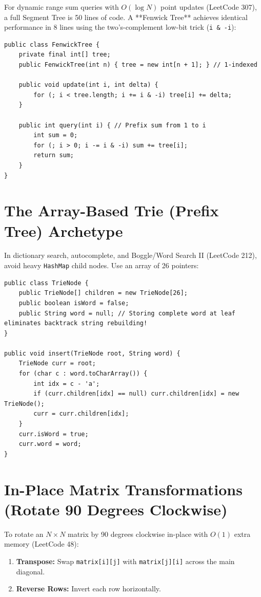 \documentclass[10pt,journal,compsoc,onecolumn]{IEEEtran}
\begin{document}
For dynamic range sum queries with $O(\log N)$ point updates (LeetCode 307), a full Segment Tree is 50 lines of code. A **Fenwick Tree** achieves identical performance in 8 lines using the two's-complement low-bit trick (\texttt{i \& -i}):

\begin{verbatim}
public class FenwickTree {
    private final int[] tree;
    public FenwickTree(int n) { tree = new int[n + 1]; } // 1-indexed

    public void update(int i, int delta) {
        for (; i < tree.length; i += i & -i) tree[i] += delta;
    }

    public int query(int i) { // Prefix sum from 1 to i
        int sum = 0;
        for (; i > 0; i -= i & -i) sum += tree[i];
        return sum;
    }
}
\end{verbatim}

\section{The Array-Based Trie (Prefix Tree) Archetype}
\label{sec:trie}

In dictionary search, autocomplete, and Boggle/Word Search II (LeetCode 212), avoid heavy \texttt{HashMap} child nodes. Use an array of 26 pointers:

\begin{verbatim}
public class TrieNode {
    public TrieNode[] children = new TrieNode[26];
    public boolean isWord = false;
    public String word = null; // Storing complete word at leaf eliminates backtrack string rebuilding!
}

public void insert(TrieNode root, String word) {
    TrieNode curr = root;
    for (char c : word.toCharArray()) {
        int idx = c - 'a';
        if (curr.children[idx] == null) curr.children[idx] = new TrieNode();
        curr = curr.children[idx];
    }
    curr.isWord = true;
    curr.word = word;
}
\end{verbatim}

\section{In-Place Matrix Transformations (Rotate 90 Degrees Clockwise)}
\label{sec:matrix_rotate}

To rotate an $N \times N$ matrix by 90 degrees clockwise in-place with $O(1)$ extra memory (LeetCode 48):
\begin{enumerate}
    \item \textbf{Transpose:} Swap \texttt{matrix[i][j]} with \texttt{matrix[j][i]} across the main diagonal.
    \item \textbf{Reverse Rows:} Invert each row horizontally.
\end{enumerate}
\end{document}
